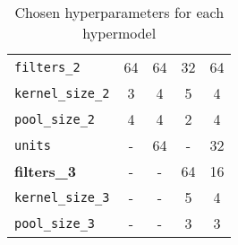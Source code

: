 \begin{table}
\begin{subtable}{\textwidth}
\begin{tabular}{lcccc}
            \texttt{filters\_2}         & 64 & 64 & 32 & 64 \\
            \texttt{kernel\_size\_2}    & 3 & 4 & 5 & 4 \\
            \texttt{pool\_size\_2}      & 4 & 4 & 2 & 4 \\
            \texttt{units}              & - & 64 & - & 32 \\
            \textbf{filters\_3}         & - & - & 64 & 16 \\
            \texttt{kernel\_size\_3}    & - & - & 5 & 4 \\
            \texttt{pool\_size\_3}      & - & - & 3 & 3 \\
        \end{tabular}
        \label{tab:chosenHyperparameters_tuners_augmented}
    \end{subtable}   
    \caption{Chosen hyperparameters for each hypermodel}    
    \label{tab:chosenHyperparameters}

\end{table}






